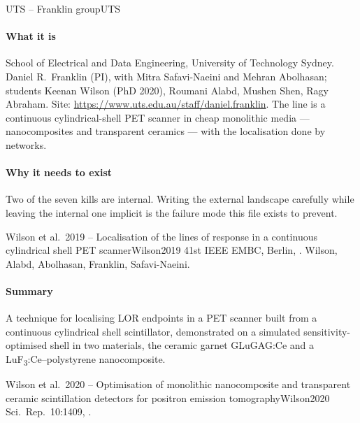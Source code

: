 \begin{programnote}{UTS -- Franklin group}{UTS}

\paragraph{What it is}
School of Electrical and Data Engineering, University of Technology Sydney.
Daniel R.\ Franklin (PI), with Mitra Safavi-Naeini and Mehran Abolhasan;
students Keenan Wilson (PhD 2020), Roumani Alabd, Mushen Shen, Ragy Abraham.
Site: \url{https://www.uts.edu.au/staff/daniel.franklin}. The line is a
continuous cylindrical-shell PET scanner in cheap monolithic media ---
nanocomposites and transparent ceramics --- with the localisation done by
networks.

\paragraph{Why it needs to exist}
Two of the seven kills are internal. Writing the external landscape carefully
while leaving the internal one implicit is the failure mode this file exists to
prevent. 

\begin{papernote}{Wilson et al.\ 2019 -- Localisation of the lines of response in a continuous cylindrical shell PET scanner}{Wilson2019}
41st IEEE EMBC, Berlin, . Wilson, Alabd,
Abolhasan, Franklin, Safavi-Naeini.

\paragraph{Summary}
A technique for localising LOR endpoints in a PET scanner built from a
continuous cylindrical shell scintillator, demonstrated on a simulated
sensitivity-optimised shell in two materials, the ceramic garnet GLuGAG:Ce and
a LuF\textsubscript{3}:Ce--polystyrene nanocomposite. 

\end{papernote}

\begin{papernote}{Wilson et al.\ 2020 -- Optimisation of monolithic nanocomposite and transparent ceramic scintillation detectors for positron emission tomography}{Wilson2020}
Sci.\ Rep.\ 10:1409, .


\end{papernote}
\end{programnote}
